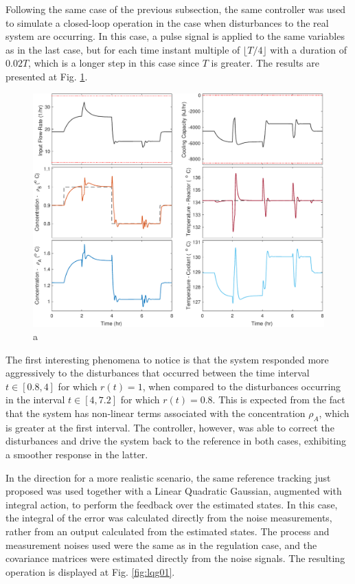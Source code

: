 \documentclass[a4paper,11pt]{book}
\numberwithin{figure}{chapter}
\numberwithin{equation}{chapter}
\numberwithin{table}{chapter}
\theoremstyle{definition}
\begin{document}
Following the same case of the previous subsection, the same controller was used to simulate a closed-loop operation in the case when disturbances to the real system are occurring. In this case, a pulse signal is applied to the same variables as in the last case, but for each time instant multiple of $\lfloor T/4 \rfloor$ with a duration of $0.02T$, which is a longer step in this case since $T$ is greater. The results are presented at Fig. \ref{fig:lqri02}. 

\begin{figure}[ht] \centering
	\includegraphics[width=\textwidth]{chapter7/lqri02}
	
	\caption{a}
	\label{fig:lqri02}
\end{figure}	

The first interesting phenomena to notice is that the system responded more aggressively to the disturbances that occurred between the time interval $t \in [0.8, 4]$ for which $r(t) = 1$, when compared to the disturbances occurring in the interval $t \in [4, 7.2]$ for which $r(t) = 0.8$. This is expected from the fact that the system has non-linear terms associated with the concentration $\rho_A$, which is greater at the first interval. The controller, however, was able to correct the disturbances and drive the system back to the reference in both cases, exhibiting a smoother response in the latter.

In the direction for a more realistic scenario, the same reference tracking just proposed was used together with a Linear Quadratic Gaussian, augmented with integral action, to perform the feedback over the estimated states. In this case, the integral of the error was calculated directly from the noise measurements, rather from an output calculated from the estimated states. The process and measurement noises used were the same as in the regulation case, and the covariance matrices were estimated directly from the noise signals. The resulting operation is displayed at Fig. \ref{fig:lqg01}.
\end{document}

